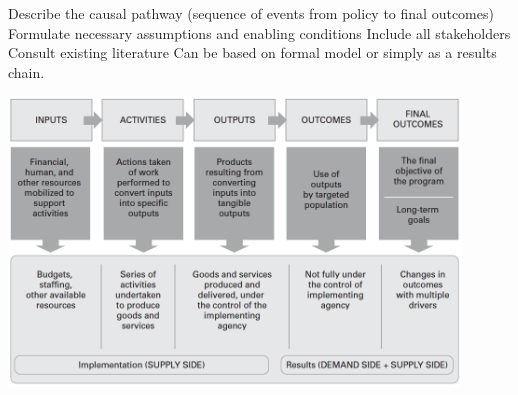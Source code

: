 \documentclass[
  25pt,         %
  a4paper,
  landscape,
  Screen4to3,
  footrule ]{foils}
\newcommand{\xx}{\item[{\small $\bullet$}]}
\begin{document}

\bi 
\x Describe the causal pathway (sequence of events from policy to final outcomes)
\x Formulate necessary assumptions and enabling conditions
\x Include all stakeholders
\x Consult existing literature
\ei
Can be based on formal model or simply as a results chain.




\begin{center}
\includegraphics[width=0.9\textwidth]{figures/results_chain}
\end{center}

\end{document}
